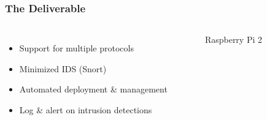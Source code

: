 \begin{frame}
\frametitle{The Deliverable}

\begin{columns}
\begin{itemize}
    \item Support for multiple protocols
    \item Minimized IDS (Snort)
    \item Automated deployment \& management
    \item Log \& alert on intrusion detections
\end{itemize}
\begin{figure}[pi]
\caption*{Raspberry Pi 2}
\end{figure}
\end{columns}
\end{frame}
